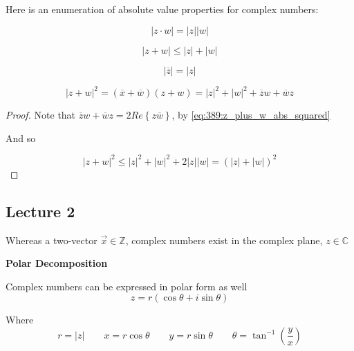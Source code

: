\documentclass[../notes.tex]{subfiles}
\begin{document}
Here is an enumeration of absolute value properties for complex numbers:

\begin{equation}
	| z \cdot  w| = |z| |w|
\end{equation}

\begin{equation}
	|z + w| \le  |z| + |w|
\end{equation}

\begin{equation}
	|\overline{z}| = |z|
\end{equation}

\begin{equation}
	|z + w|^2 = (\overline{x} + \overline{w}) (z + w) = |z|^2 + |w|^2 + \overline{z}w + \overline{w}z
	\label{eq:389:z_plus_w_abs_squared}
\end{equation}

\begin{proof}

Note that $ \overline{z}w + \overline{w}z = 2 Re \left\{ z \overline{w} \right\}  $, by \eqref{eq:389:z_plus_w_abs_squared}

And so 

\begin{equation}
	|z + w|^2 \le  |z|^2 + |w|^2 + 2 |z| |w| = (|z| + |w|)^2
\end{equation}
	
\end{proof}

\subsection{Lecture 2}

Whereas a two-vector $ \vec{x} \in \mathbb{Z} $, complex numbers exist in the complex plane, $ z \in \mathbb{C} $ 



\begin{theorem}
	\textbf{Polar Decomposition} 

	Complex numbers can be expressed in polar form as well
	\begin{equation}
		z = r(\cos \theta + i \sin \theta)
		\label{eq:389:complex_polar}
	\end{equation}

	Where
	\begin{equation}
		r = |z| \qquad x = r\cos \theta \qquad y = r\sin \theta \qquad \theta = \tan^{-1} \left(  \frac{y}{x} \right)
	\end{equation}
\end{theorem}
\end{document}
